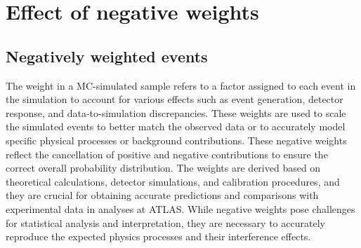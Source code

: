\begin{comment}
%
%
asdf
\end{comment}

\chapter{Effect of negative weights}
\label{chap:Appendix:NegWeights}



\section{Negatively weighted events}
\label{chap:Appendix:NegWeights:intro}

The weight in a MC-simulated sample refers to a factor assigned to each 
event in the simulation to account for various effects such as event generation, 
detector response, and data-to-simulation discrepancies. These weights are used 
to scale the simulated events to better match the observed data or to accurately 
model specific physical processes or background contributions.  These negative weights reflect the cancellation 
of positive and negative contributions to ensure the correct overall probability distribution. 
The weights are derived based on theoretical calculations, detector simulations, and calibration 
procedures, and they are crucial for obtaining accurate predictions and comparisons 
with experimental data in analyses at ATLAS.
While negative weights pose challenges for statistical analysis and interpretation, they are necessary 
to accurately reproduce the expected physics processes and their interference effects. 



